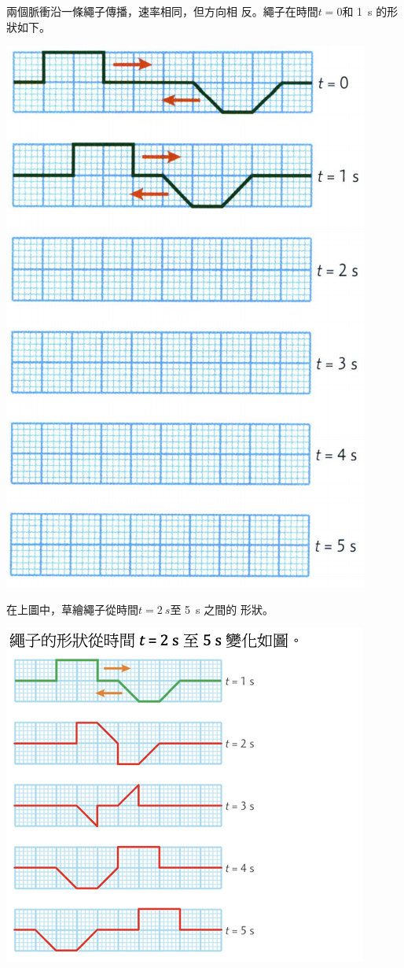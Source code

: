 {
    兩個脈衝沿一條繩子傳播，速率相同，但方向相 反。繩子在時間$t=0$和 \qty{1}{s} 的形狀如下。
    \par{\par\centering\includegraphics[width=.6\textwidth]{./img/ch3_earlyclass_wave_lq_2024-05-14-10-14-23.png}\par}
    在上圖中，草繪繩子從時間$t= \qty{2}{s} $至 \qty{5}{s} 之間的 形狀。
}{
    \sol\par{\par\centering\includegraphics[width=.7\textwidth]{./img/ch3_earlyclass_wave_lq_2024-05-14-10-15-47.png}\par}
}

